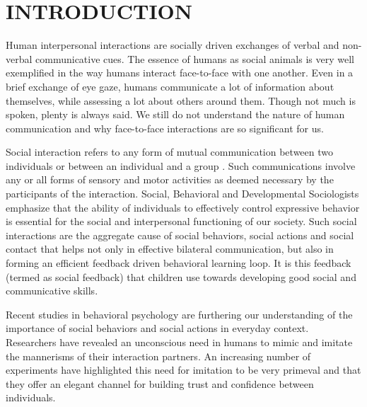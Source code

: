 \documentclass[oneside,11pt]{memoir}
\begin{document}
\pagestyle{plain}

\chapter{INTRODUCTION}

\DoubleSpacing
\setlength{\parindent}{.5in}
Human interpersonal interactions are socially driven exchanges of verbal and non-verbal communicative cues. The essence of humans as social animals is very well exemplified in the way humans interact face-to-face with one another. Even in a brief exchange of eye gaze, humans communicate a lot of information about themselves, while assessing a lot about others around them. Though not much is spoken, plenty is always said. We still do not understand the nature of human communication and why face-to-face interactions are so significant for us.

Social interaction refers to any form of mutual communication between two individuals or between an individual and a group \cite{riggio_assessment_1986}. Such communications involve any or all forms of sensory and motor activities as deemed necessary by the participants of the interaction. Social, Behavioral and Developmental Sociologists emphasize that the ability of individuals to effectively control expressive behavior is essential for the social and interpersonal functioning of our society. Such social interactions are the aggregate cause of social behaviors, social actions and social contact that helps not only in effective bilateral communication, but also in forming an efficient feedback driven behavioral learning loop. It is this feedback (termed as social feedback) that children use towards developing good social and communicative skills.

Recent studies in behavioral psychology are furthering our understanding of the importance of social behaviors and social actions in everyday context. Researchers have revealed an unconscious need in humans to mimic and imitate the mannerisms of their interaction partners. An increasing number of experiments have highlighted this need for imitation to be very primeval and that they offer an elegant channel for building trust and confidence between individuals.
\end{document}
